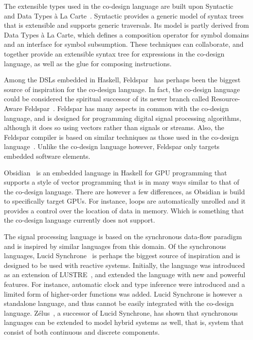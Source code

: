 \documentclass[../paper.tex]{subfiles}
\begin{document}
The extensible types used in the co-design language are built upon Syntactic~\cite{axelsson2012} and Data Types \`{a} La Carte~\cite{DTC}. Syntactic provides a generic model of syntax trees that is extensible and supports generic traversals. Its model is partly derived from Data Types \`{a} La Carte, which defines a composition operator for symbol domains and an interface for symbol subsumption. These techniques can collaborate, and together provide an extensible syntax tree for expressions in the co-design language, as well as the glue for composing instructions.

Among the DSLs embedded in Haskell, Feldspar~\cite{axelsson2010, axelsson2010-2} has perhaps been the biggest source of inspiration for the co-design language. In fact, the co-design language could be considered the spiritual successor of its newer branch called Resource-Aware Feldspar~\cite{raw-feldspar}. Feldspar has many aspects in common with the co-design language, and is designed for programming digital signal processing algorithms, although it does so using vectors rather than signals or streams. Also, the Feldspar compiler is based on similar techniques as those used in the co-design language~\cite{axelsson2016, axelsson2015}. Unlike the co-design language however, Feldspar only targets embedded software elements.

Obsidian~\cite{svensson2008} is an embedded language in Haskell for GPU programming that supports a style of vector programming that is in many ways similar to that of the co-design language. There are however a few differences, as Obsidian is build to specifically target GPUs. For instance, loops are automatically unrolled and it provides a control over the location of data in memory. Which is something that the co-design language currently does not support.

The signal processing language is based on the synchronous data-flow paradigm and is inspired by similar languages from this domain. Of the synchronous languages, Lucid Synchrone~\cite{pouzet2006, colaco2004} is perhaps the biggest source of inspiration and is designed to be used with reactive systems. Initially, the language was introduced as an extension of LUSTRE~\cite{hu1998}, and extended the language with new and powerful features. For instance, automatic clock and type inference were introduced and a limited form of higher-order functions was added. Lucid Synchrone is however a standalone language, and thus cannot be easily integrated with the co-design language. Z{\'e}lus~\cite{zelus2013}, a successor of Lucid Synchrone, has shown that synchronous languages can be extended to model hybrid systems as well, that is, system that consist of both continuous and discrete components.
\end{document}
